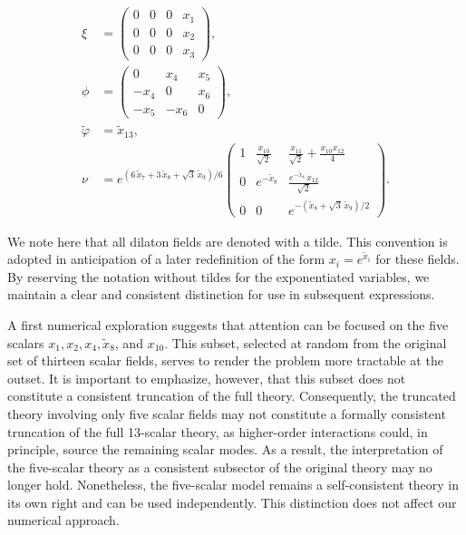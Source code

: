 \documentclass[11pt]{article}
\begin{document}
\begin{equation}
	\begin{aligned}
		\xi &= \begin{pmatrix}
					0 & 0 & 0 & x_{1} \\
					0 & 0 & 0 & x_{2} \\
					0 & 0 & 0 & x_{3}
				\end{pmatrix}, \\[5pt]
		\phi &= \begin{pmatrix}
					0 & x_{4} & x_{5} \\
					-x_{4} & 0 & x_{6} \\
					-x_{5} & -x_{6} & 0
				\end{pmatrix}, \\[5pt]
		\tilde{\varphi} &= \tilde{x}_{13}, \\[5pt]
		\nu &= e^{(6\,\tilde{x}_{7}+3\,\tilde{x}_{8}+\sqrt{3}\,\tilde{x}_{9})/6}
				\begin{pmatrix}
					1 & \frac{x_{10}}{\sqrt{2}} & \frac{x_{11}}{\sqrt{2}} + \frac{x_{10}x_{12}}{4} \\
					0 & e^{-\tilde{x}_{8}} & \frac{e^{-\tilde{x}_{8}}\,x_{12}}{\sqrt{2}} \\
					0 & 0 & e^{-(\tilde{x}_{8}+\sqrt{3}\,\tilde{x}_{9})/2}
				\end{pmatrix}.
	\end{aligned}
\end{equation}

We note here that all dilaton fields are denoted with a tilde. This convention is adopted in anticipation of a later redefinition of the form \( x_i = e^{\tilde{x}_i} \) for these fields. By reserving the notation without tildes for the exponentiated variables, we maintain a clear and consistent distinction for use in subsequent expressions.

A first numerical exploration suggests that attention can be focused on the five scalars $x_{1}, x_{2}, x_{4}, \tilde{x}_{8}$, and $x_{10}$. This subset, selected at random from the original set of thirteen scalar fields, serves to render the problem more tractable at the outset. It is important to emphasize, however, that this subset does not constitute a consistent truncation of the full theory. Consequently, the truncated theory involving only five scalar fields may not constitute a formally consistent truncation of the full 13-scalar theory, as higher-order interactions could, in principle, source the remaining scalar modes. As a result, the interpretation of the five-scalar theory as a consistent subsector of the original theory may no longer hold. Nonetheless, the five-scalar model remains a self-consistent theory in its own right and can be used independently. This distinction does not affect our numerical approach.
\end{document}
